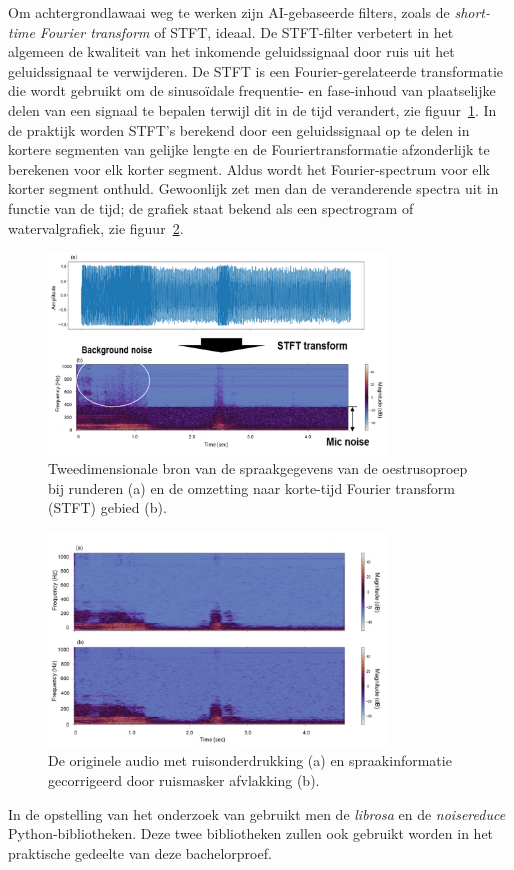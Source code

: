 Om achtergrondlawaai weg te werken zijn AI-gebaseerde filters, zoals de \textit{short-time Fourier transform} of STFT, ideaal. De STFT-filter verbetert in het algemeen de kwaliteit van het inkomende geluidssignaal door ruis uit het geluidssignaal te verwijderen.
De STFT is een Fourier-gerelateerde transformatie die wordt gebruikt om de sinusoïdale frequentie- en fase-inhoud van plaatselijke delen van een signaal te bepalen terwijl dit in de tijd verandert, zie figuur~\ref{fig:conversion}. In de praktijk worden STFT's berekend door een geluidssignaal op te delen in kortere segmenten van gelijke lengte en de Fouriertransformatie afzonderlijk te berekenen voor elk korter segment. Aldus wordt het Fourier-spectrum voor elk korter segment onthuld. Gewoonlijk zet men dan de veranderende spectra uit in functie van de tijd; de grafiek staat bekend als een spectrogram of watervalgrafiek, zie figuur~\ref{fig:The_original_noise-removed_audio}.~\autocite{Jung2021}

\begin{figure}
    \centering
    \includegraphics[width=0.8\textwidth]{./img/conversion}
    \caption{\label{fig:conversion}Tweedimensionale bron van de spraakgegevens van de oestrusoproep bij runderen (a) en de omzetting naar korte-tijd Fourier transform (STFT) gebied (b).~\autocite{Jung2021}}
\end{figure}

\begin{figure}
    \centering
    \includegraphics[width=0.8\textwidth]{./img/The_original_noise-removed_audio}
    \caption{\label{fig:The_original_noise-removed_audio}De originele audio met ruisonderdrukking (a) en spraakinformatie gecorrigeerd door ruismasker afvlakking (b).~\autocite{Jung2021}}
\end{figure}

In de opstelling van het onderzoek van \textcite{Jung2021} gebruikt men de \textit{librosa} en de \textit{noisereduce} Python-bibliotheken. Deze twee bibliotheken zullen ook gebruikt worden in het praktische gedeelte van deze bachelorproef.
